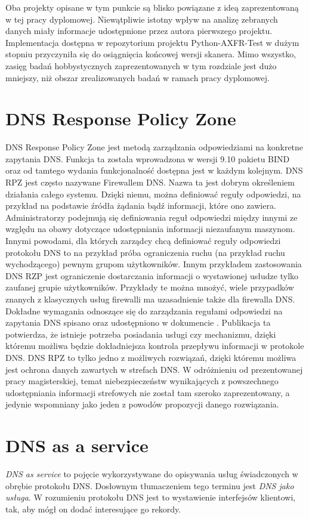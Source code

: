 Oba projekty opisane w tym punkcie są blisko powiązane z ideą zaprezentowaną w tej pracy dyplomowej. Niewątpliwie istotny wpływ
na analizę zebranych danych miały informacje udostępnione przez autora pierwszego projektu. Implementacja dostępna w repozytorium
projektu Python-AXFR-Test \cite{python_axfr_test} w dużym stopniu przyczyniła się do osiągnięcia końcowej wersji skanera. Mimo
wszystko, zasięg badań hobbystycznych zaprezentowanych w tym rozdziale jest dużo mniejszy, niż obszar zrealizowanych badań w ramach
pracy dyplomowej.

\section{DNS Response Policy Zone}
\noindent DNS Response Policy Zone jest metodą zarządzania odpowiedziami na konkretne zapytania DNS. Funkcja ta została wprowadzona w wersji
9.10 pakietu BIND oraz od tamtego wydania funkcjonalność dostępna jest w każdym kolejnym. DNS RPZ jest często nazywane Firewallem DNS.
Nazwa ta jest dobrym określeniem działania całego systemu. Dzięki niemu, można definiować reguły odpowiedzi, na przykład na podstawie
źródła żądania bądź informacji, które ono zawiera. Administratorzy podejmują się definiowania reguł odpowiedzi między innymi
ze względu na obawy dotyczące udostępniania
informacji niezaufanym maszynom. Innymi powodami, dla których zarządcy chcą definiować reguły odpowiedzi protokołu DNS to na przykład
próba ograniczenia ruchu (na przykład ruchu wychodzącego) pewnym grupom użytkowników. Innym przykładem zastosowania DNS RZP
jest ograniczenie dostarczania informacji o wystawionej usłudze tylko zaufanej grupie użytkowników. Przykłady te można mnożyć,
wiele przypadków znanych z klasycznych usług firewalli ma uzasadnienie także dla firewalla DNS. Dokładne wymagania odnoszące się do
zarządzania regułami odpowiedzi na zapytania DNS spisano oraz udostępniono w dokumencie \cite{I-D.ietf-dnsop-dns-rpz}. Publikacja ta
potwierdza, że istnieje potrzeba posiadania usługi czy mechanizmu, dzięki któremu możliwa będzie dokładniejsza kontrola przepływu
informacji w protokole DNS. DNS RPZ to tylko jedno z możliwych rozwiązań, dzięki któremu
możliwa jest ochrona danych zawartych w strefach DNS. W odróżnieniu od prezentowanej pracy magisterskiej, temat niebezpieczeństw
wynikających z powszechnego udostępniania informacji
strefowych nie został tam szeroko zaprezentowany, a jedynie wspomniany jako jeden z powodów propozycji danego rozwiązania.

\section{DNS as a service}
\label{dnsasservice}
\noindent \textit{DNS as service} to pojęcie wykorzystywane do opisywania usług świadczonych w obrębie protokołu DNS. Dosłownym tłumaczeniem tego
terminu jest \textit{DNS jako usługa}. W rozumieniu protokołu DNS jest to wystawienie interfejsów klientowi, tak,
aby mógł on dodać interesujące go rekordy.

